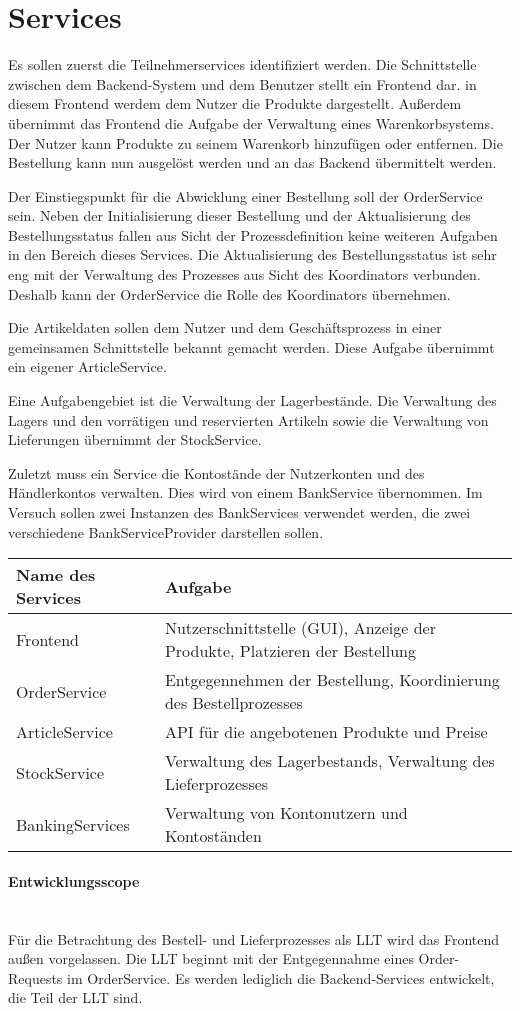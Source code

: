 \section{Services} \label{sec_Services}
Es sollen zuerst die Teilnehmerservices identifiziert werden. Die Schnittstelle zwischen dem Backend-System und dem Benutzer stellt ein Frontend dar. in diesem Frontend werdem dem Nutzer die Produkte dargestellt. Außerdem übernimmt das Frontend die Aufgabe der Verwaltung eines Warenkorbsystems. Der Nutzer kann Produkte zu seinem Warenkorb hinzufügen oder entfernen. Die Bestellung kann nun ausgelöst werden und an das Backend übermittelt werden. 

Der Einstiegspunkt für die Abwicklung einer Bestellung soll der OrderService sein. Neben der Initialisierung dieser Bestellung und der Aktualisierung des Bestellungsstatus fallen aus Sicht der Prozessdefinition keine weiteren Aufgaben in den Bereich dieses Services. Die Aktualisierung des Bestellungsstatus ist sehr eng mit der Verwaltung des Prozesses aus Sicht des Koordinators verbunden. Deshalb kann der OrderService die Rolle des Koordinators übernehmen. 

Die Artikeldaten sollen dem Nutzer und dem Geschäftsprozess in einer gemeinsamen Schnittstelle bekannt gemacht werden. Diese Aufgabe übernimmt ein eigener ArticleService. 

Eine Aufgabengebiet ist die Verwaltung der Lagerbestände. Die Verwaltung des Lagers und den vorrätigen und reservierten Artikeln sowie die Verwaltung von Lieferungen übernimmt der StockService. 

Zuletzt muss ein Service die Kontostände der Nutzerkonten und des Händlerkontos verwalten. Dies wird von einem BankService übernommen. Im Versuch sollen zwei Instanzen des BankServices verwendet werden, die zwei verschiedene BankServiceProvider darstellen sollen. 

\begin{center}
	\begin{tabular}[h]{|p{3.5cm}|p{12cm}|}
		\hline
		Name des Services & Aufgabe \\ \hline
		Frontend & Nutzerschnittstelle (GUI), Anzeige der Produkte, Platzieren der Bestellung \\ \hline
		OrderService & Entgegennehmen der Bestellung, Koordinierung des Bestellprozesses \\ \hline
		ArticleService & API für die angebotenen Produkte und Preise \\ \hline
		StockService & Verwaltung des Lagerbestands, Verwaltung des Lieferprozesses \\ \hline
		BankingServices & Verwaltung von Kontonutzern und Kontoständen \\ \hline
	\end{tabular}
\end{center}

\paragraph*{Entwicklungsscope} \mbox{} \\
Für die Betrachtung des Bestell- und Lieferprozesses als LLT wird das Frontend außen vorgelassen. Die LLT beginnt mit der Entgegennahme eines Order-Requests im OrderService. Es werden lediglich die Backend-Services entwickelt, die Teil der LLT sind.